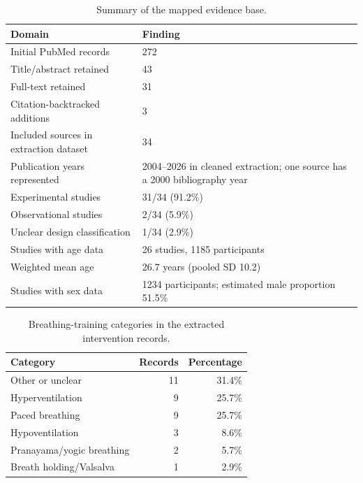 \begin{table}[tbp]
\centering
\caption{Summary of the mapped evidence base.}
\label{tab:evidence-map}
\begin{tabularx}{\textwidth}{@{}lX@{}}
\toprule
Domain & Finding \\
\midrule
Initial PubMed records & 272 \\
Title/abstract retained & 43 \\
Full-text retained & 31 \\
Citation-backtracked additions & 3 \\
Included sources in extraction dataset & 34 \\
Publication years represented & 2004--2026 in cleaned extraction; one source has a 2000 bibliography year \\
Experimental studies & 31/34 (91.2\%) \\
Observational studies & 2/34 (5.9\%) \\
Unclear design classification & 1/34 (2.9\%) \\
Studies with age data & 26 studies, 1185 participants \\
Weighted mean age & 26.7 years (pooled SD 10.2) \\
Studies with sex data & 1234 participants; estimated male proportion 51.5\% \\
\bottomrule
\end{tabularx}
\end{table}

\begin{table}[tbp]
\centering
\caption{Breathing-training categories in the extracted intervention records.}
\label{tab:bt-categories}
\begin{tabular}{@{}lrr@{}}
\toprule
Category & Records & Percentage \\
\midrule
Other or unclear & 11 & 31.4\% \\
Hyperventilation & 9 & 25.7\% \\
Paced breathing & 9 & 25.7\% \\
Hypoventilation & 3 & 8.6\% \\
Pranayama/yogic breathing & 2 & 5.7\% \\
Breath holding/Valsalva & 1 & 2.9\% \\
\bottomrule
\end{tabular}
\end{table}

